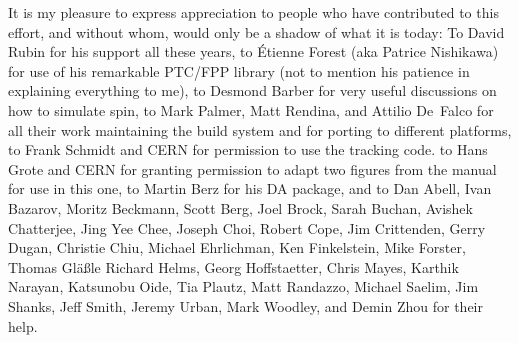 It is my pleasure to express appreciation to people who have contributed to this effort, and without
whom, \bmad would only be a shadow of what it is today: To David Rubin for his support all these
years, to \'Etienne Forest (aka Patrice Nishikawa) for use of his remarkable PTC/FPP library (not to
mention his patience in explaining everything to me), to Desmond Barber for very useful discussions
on how to simulate spin, to Mark Palmer, Matt Rendina, and Attilio De~Falco for all their work
maintaining the build system and for porting \bmad to different platforms, to Frank Schmidt and CERN
for permission to use the \mad tracking code. to Hans Grote and CERN for granting permission to
adapt two figures from the \mad manual for use in this one, to Martin Berz for his DA package, and
to Dan Abell, Ivan Bazarov, Moritz Beckmann, Scott Berg, Joel Brock, Sarah Buchan, Avishek
Chatterjee, Jing Yee Chee, Joseph Choi, Robert Cope, Jim Crittenden, Gerry Dugan, Christie Chiu,
Michael Ehrlichman, Ken Finkelstein, Mike Forster, Thomas Gl{\"a}{\ss}le Richard Helms, Georg
Hoffstaetter, Chris Mayes, Karthik Narayan, Katsunobu Oide, Tia Plautz, Matt Randazzo, Michael
Saelim, Jim Shanks, Jeff Smith, Jeremy Urban, Mark Woodley, and Demin Zhou for their help.

